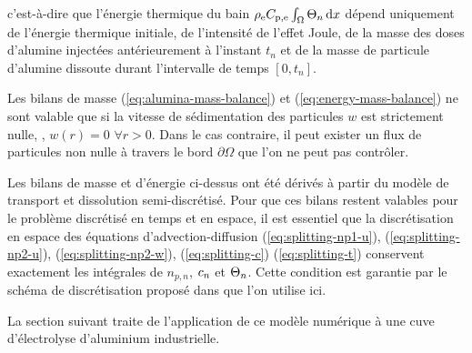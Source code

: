 c'est-à-dire que l'énergie thermique du bain
$\rho_\mathrm{e}C_{\mathrm{p,e}}\int_\Omega\Theta_{n}\,\mathrm dx$
dépend uniquement de l'énergie thermique initiale, de l'intensité de
l'effet Joule, de la masse des doses d'alumine injectées
antérieurement à l'instant $t_n$ et de la masse de particule d'alumine
dissoute durant l'intervalle de temps $[0, t_n]$.

\begin{remarque}
  Les bilans de masse (\ref{eq:alumina-mass-balance}) et
  (\ref{eq:energy-mass-balance}) ne sont valable que si la vitesse de
  sédimentation des particules $w$ est strictement nulle, \ie, $w(r) =
  0$ $\forall r > 0$. Dans le cas contraire, il peut exister un flux
  de particules non nulle à travers le bord $\partial \Omega$ que l'on
  ne peut pas contrôler.
\end{remarque}

\begin{remarque}
  Les bilans de masse et d'énergie ci-dessus ont été dérivés à partir du
  modèle de transport et dissolution semi-discrétisé. Pour que ces
  bilans restent valables pour le problème discrétisé en temps et en
  espace, il est essentiel que la discrétisation en espace des équations
  d'advection-diffusion (\ref{eq:splitting-np1-u}),
  (\ref{eq:splitting-np2-u}), (\ref{eq:splitting-np2-w}),
  (\ref{eq:splitting-c}) (\ref{eq:splitting-t}) conservent exactement
  les intégrales de $n_{p,n}$, $c_n$ et
  $\Theta_n$. Cette condition est garantie par le schéma de
  discrétisation proposé dans \cite{Hofer2011} que l'on utilise ici.
\end{remarque}

La section suivant traite de l'application de ce modèle numérique à
une cuve d'électrolyse d'aluminium industrielle.
